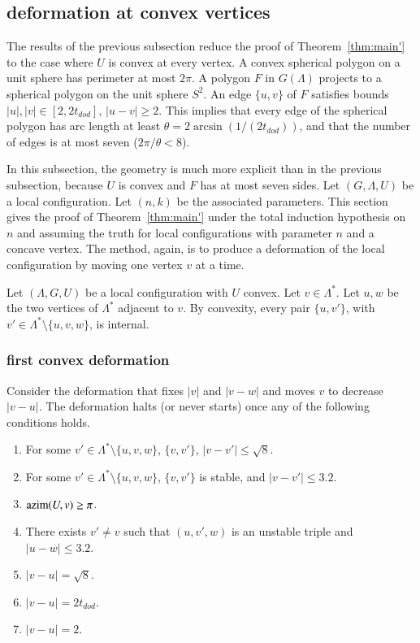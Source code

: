\documentclass{article} %
\begin{document}
\subsection{deformation at convex vertices}

The results of the previous subsection
reduce the proof of Theorem~\ref{thm:main'} to
the case where $U$ is convex at every vertex.  A convex
spherical polygon on a unit sphere has perimeter
at most $2\pi$.  A polygon $F$ in $G(\Lambda)$ projects to
a spherical polygon on the unit sphere $S^2$.  An edge $\{u,v\}$ of
$F$ satisfies bounds $|u|,|v|\in[2,2t_{dod}]$, $|u-v|\ge 2$. This
implies that every edge of the spherical polygon has arc length
at least $\theta=2\arcsin(1/(2t_{dod}))$, and that the number
of edges is at most seven ($2\pi/\theta < 8$).

In this subsection, the geometry is much more explicit than in the
previous subsection, because $U$ is convex and $F$ has at most seven sides.
Let $(G,\Lambda,U)$ be a local configuration.
Let $(n,k)$ be the associated parameters.
This section gives the proof of Theorem~\ref{thm:main'} under 
the total induction hypothesis on $n$ and assuming the truth
for local configurations with parameter $n$ and a concave vertex.
The method, again, is to produce a deformation of the local
configuration by moving one vertex $v$ at a time.



Let $(\Lambda,G,U)$ be a local configuration with $U$ convex.
Let $v\in\Lambda^*$.  
Let $u,w$ be the two vertices of $\Lambda^*$
adjacent to $v$.  By convexity, every pair $\{u,v'\}$,
with $v'\in\Lambda^*\setminus\{u,v,w\}$, is internal.


\subsubsection{first convex deformation}

Consider the deformation that fixes $|v|$ and $|v-w|$ and
moves $v$ to decrease $|v-u|$.  
The deformation halts (or never starts) once any
of the following conditions holds.
\begin{enumerate}\label{e:halt-convex}
\item For some $v'\in\Lambda^*\setminus\{u,v,w\}$, 
$\{v,v'\}$, $|v-v'|\le \sqrt8$.
\item For some $v'\in\Lambda^*\setminus\{u,v,w\}$,
$\{v,v'\}$ is  stable, and $|v-v'|\le 3.2$.
\item ${\operatorname{azim}}(U,v)\ge\pi$.
\item There exists $v'\ne v$ such that 
$(u,v',w)$ is an unstable triple and $|u-w|\le3.2$.
\item $|v-u|=\sqrt8$.
\item $|v-u|=2t_{dod}$.
\item $|v-u|=2$.
\end{enumerate}
\end{document}
